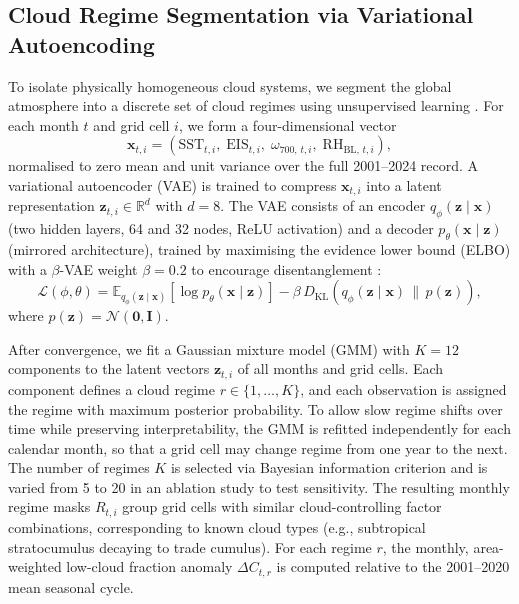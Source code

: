 \documentclass{article}
\begin{document}
\subsection{Cloud Regime Segmentation via Variational Autoencoding}
\label{sec:regime}
To isolate physically homogeneous cloud systems, we segment the global atmosphere into a discrete set of cloud regimes using unsupervised learning \cite{tomassini2012cloud,jakob2012regime}. For each month $t$ and grid cell $i$, we form a four-dimensional vector
\begin{equation}
\mathbf{x}_{t,i} = \left( \text{SST}_{t,i},\; \text{EIS}_{t,i},\; \omega_{700,\,t,i},\; \text{RH}_{\text{BL},\,t,i} \right),
\end{equation}
normalised to zero mean and unit variance over the full 2001–2024 record. A variational autoencoder (VAE) \cite{kingma2014auto} is trained to compress $\mathbf{x}_{t,i}$ into a latent representation $\mathbf{z}_{t,i} \in \mathbb{R}^d$ with $d=8$. The VAE consists of an encoder $q_\phi(\mathbf{z} \mid \mathbf{x})$ (two hidden layers, 64 and 32 nodes, ReLU activation) and a decoder $p_\theta(\mathbf{x} \mid \mathbf{z})$ (mirrored architecture), trained by maximising the evidence lower bound (ELBO) with a $\beta$-VAE weight $\beta=0.2$ to encourage disentanglement \cite{higgins2017beta}:
\begin{equation}
\mathcal{L}(\phi,\theta) = \mathbb{E}_{q_\phi(\mathbf{z}\mid\mathbf{x})}[\log p_\theta(\mathbf{x}\mid\mathbf{z})] - \beta\, D_{\mathrm{KL}}\!\left(q_\phi(\mathbf{z}\mid\mathbf{x})\,\|\, p(\mathbf{z})\right),
\end{equation}
where $p(\mathbf{z}) = \mathcal{N}(\mathbf{0}, \mathbf{I})$.

After convergence, we fit a Gaussian mixture model (GMM) with $K=12$ components to the latent vectors $\mathbf{z}_{t,i}$ of all months and grid cells. Each component defines a cloud regime $r\in\{1,\dots,K\}$, and each observation is assigned the regime with maximum posterior probability. To allow slow regime shifts over time while preserving interpretability, the GMM is refitted independently for each calendar month, so that a grid cell may change regime from one year to the next. The number of regimes $K$ is selected via Bayesian information criterion and is varied from 5 to 20 in an ablation study to test sensitivity. The resulting monthly regime masks $R_{t,i}$ group grid cells with similar cloud-controlling factor combinations, corresponding to known cloud types (e.g., subtropical stratocumulus decaying to trade cumulus). For each regime $r$, the monthly, area-weighted low-cloud fraction anomaly $\Delta C_{t,r}$ is computed relative to the 2001–2020 mean seasonal cycle.
\end{document}
